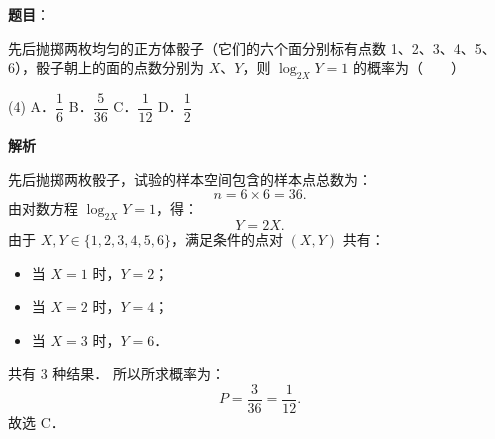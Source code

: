 \begin{answer}

\textbf{题目}：

先后抛掷两枚均匀的正方体骰子（它们的六个面分别标有点数 1、2、3、4、5、6），骰子朝上的面的点数分别为 $X$、$Y$，则 $\log_{2X} Y = 1$ 的概率为\mbox{（　　）}

\begin{gkopts}(4)
\task A．$\dfrac{1}{6}$
\task B．$\dfrac{5}{36}$
\task C．$\dfrac{1}{12}$
\task D．$\dfrac{1}{2}$
\end{gkopts}

\textbf{解析}

先后抛掷两枚骰子，试验的样本空间包含的样本点总数为：
\nopagebreak[4]
\[
n = 6 \times 6 = 36.
\]
由对数方程 $\log_{2X} Y = 1$，得：
\nopagebreak[4]
\[
Y = 2X.
\]
由于 $X, Y \in \{1, 2, 3, 4, 5, 6\}$，满足条件的点对 $(X, Y)$ 共有：
\begin{itemize}
\item 当 $X = 1$ 时，$Y = 2$；
\item 当 $X = 2$ 时，$Y = 4$；
\item 当 $X = 3$ 时，$Y = 6$．
\end{itemize}

共有 3 种结果．
所以所求概率为：
\nopagebreak[4]
\[
P = \frac{3}{36} = \frac{1}{12}.
\]
故选 C．


\end{answer}
